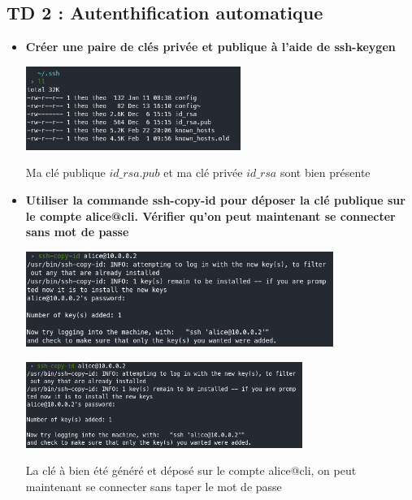 \documentclass[12pt]{article}
\begin{document}
  \subsection{TD 2 : Autenthification automatique}
  \vspace{0.3cm}

\begin{itemize}
  \item \textbf{Créer une paire de clés privée et publique à l'aide de ssh-keygen}
  \vspace{0.3cm}

  \includegraphics[width=7cm]{images/screen-ssh-td2.png}
  \vspace{0.3cm}

  Ma clé publique \(id\_rsa.pub\) et ma clé privée \(id\_rsa\) sont bien présente
\end{itemize}
\vspace{0.3cm}

\begin{itemize}
  \item \textbf{Utiliser la commande ssh-copy-id pour déposer la clé publique sur le compte alice@cli.
  Vérifier qu'on peut maintenant se connecter sans mot de passe}
  \vspace{0.3cm}

  \includegraphics[width=10cm]{images/screen-ssh-td2-2.png}
  \vspace{0.3cm}

  \includegraphics[width=9cm]{images/screen-ssh-td2-2.png}
  \vspace{0.3cm}

  La clé à bien été généré et déposé sur le compte alice@cli, on peut maintenant se connecter sans taper le mot de passe
\end{itemize}
\vspace{0.3cm}
\end{document}

